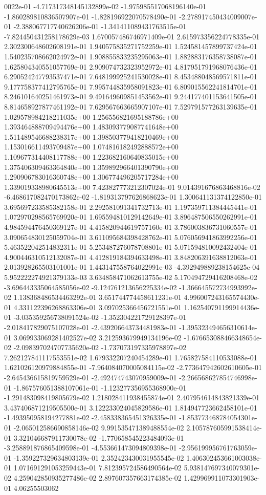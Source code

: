 0022e-01	-4.717317348145132899e-02	-1.975985517068196140e-01	-1.860289810836507907e-01	-1.828196922070578490e-01	-2.278917450434009007e-01	-2.388067717740626206e-01	-1.341411089431763515e-01	-7.824450431258178629e-03	1.670057486746971409e-01	2.615973356224778335e-01	2.302300648602608191e-01	1.940575835271752259e-01	1.524581457899737424e-01	1.540235708662024972e-01	1.908855833235295063e-01	1.882883176358738087e-01	1.625804340551057769e-01	2.909074732323952972e-01	4.817951791968076436e-01	6.290524247793537471e-01	7.648199925241530028e-01	8.453488048569571811e-01	9.177758377412795765e-01	7.995744835958091823e-01	6.809015562241814701e-01	8.246101640251461973e-01	9.491649609851453562e-01	9.244177401153641505e-01	8.814658927877461192e-01	7.629567663665907107e-01	7.529791577263139635e-01	1.029578984218211035e+00	1.256556821695188786e+00	1.393464888709494476e+00	1.483093779087741648e+00	1.511489546688238317e+00	1.398503779418210469e+00	1.153016611493709487e+00	1.074816182492888572e+00	1.109677314408117788e+00	1.223682160640835015e+00	1.375406309463364840e+00	1.359892966401390790e+00	1.290906783016360748e+00	1.306774496205717284e+00	1.339019338980645513e+00	7.423827773212307024e-01	9.014391676863468816e-02	-6.468617082470173862e-02	-1.819313797626868623e-01	1.300641131374122850e-01	3.695697233585382158e-01	2.292581091341732713e-01	1.197359711384445441e-01	1.072970298565769920e-01	1.695594810129142649e-01	3.896487506550262991e-01	4.984594476450369127e-01	4.415820944619757160e-01	3.786003836731060557e-01	3.090654830125059704e-01	3.611095684398428762e-01	5.076056941863992256e-01	5.463522042514832311e-01	5.253487276078708801e-01	5.071594810092432404e-01	4.900446310512132087e-01	4.412819184394633498e-01	3.848206391638812063e-01	2.013928265503101001e-01	1.443147558764022991e-03	-4.392949889238154625e-04	5.952222274921379133e-03	3.634858471062613755e-02	5.170494729416208468e-02	-3.696443335064585056e-02	-9.124761213656225334e-02	-1.366645572734993992e-02	1.138368486534463292e-01	3.651744774458611231e-01	4.996007243165574430e-01	4.331122396268863306e-01	3.097025366456721551e-01	1.162540791199914436e-01	-3.035359256738091524e-02	-1.352304221729128397e-01	-2.018417829075107028e-01	-2.439206643734481983e-01	-1.395323494656310614e-01	3.069933069281402527e-02	3.212593679949134196e-02	-1.676653088466348654e-02	-2.098397024707735620e-02	-1.737073197335978897e-02	7.262127841117553551e-02	1.679332207240454289e-01	1.765827584110533088e-01	1.621026120979884855e-01	-7.964084070005084115e-02	-2.773647942602610605e-01	-2.645436615819759529e-01	-2.492474743070959009e-01	-2.266568627854746998e-01	-1.867576051388107061e-01	-1.123277356955368900e-01	-1.291483098419805679e-02	1.218028411938455874e-01	2.407954614843821339e-01	3.437406871219505500e-01	3.122233024045829586e-01	1.814947723662458101e-01	-1.493950958194277881e-02	-2.458338365451326335e-01	-1.853773468784054301e-01	-2.065012586690858146e-02	9.991535471389488554e-02	2.105787605991538414e-01	3.321046687911730078e-02	-1.770658545223484093e-01	-3.258891876865409598e-01	-4.553661473094809398e-01	-2.956199956761763059e-01	-1.359227329634803139e-01	2.352423430031955545e-02	1.406302453661003038e-01	1.071691291053259443e-01	7.812395724586490564e-02	5.938147697340079301e-02	4.259042850935277486e-02	2.897607357663174385e-02	1.429969911073301903e-01	4.06255503062